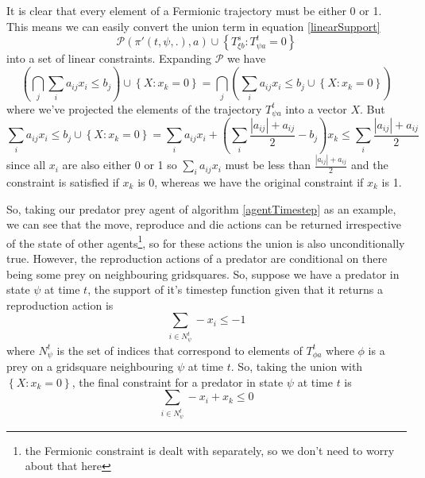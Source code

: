 \documentclass{article}
\begin{document}
It is clear that every element of a Fermionic trajectory must be either 0 or 1. This means we can easily convert the union term in equation \ref{linearSupport} 
\[
\mathcal{P}(\pi'(t,\psi,.), a) \cup \left\{T^s_{\xi b}: T^t_{\psi a} = 0\right\}
\]
into a set of linear constraints. Expanding $\mathcal{P}$ we have
\[
\left(\bigcap_j \sum_i a_{ij}x_i \le b_j \right) \cup \left\{X: x_k = 0\right\} = \bigcap_j \left( \sum_i a_{ij}x_i \le b_j  \cup \left\{X: x_k = 0\right\}\right)
\]
where we've projected the elements of the trajectory $T^t_{\psi a}$ into a vector $X$. But
\[
\sum_i a_{ij}x_i \le b_j  \cup \left\{X: x_k = 0\right\} = \sum_i a_{ij}x_i + \left(\sum_i \frac{|a_{ij}| + a_{ij}}{2} - b_j\right)x_k \le \sum_i \frac{|a_{ij}| + a_{ij}}{2} 
\]
since all $x_i$ are also either 0 or 1 so $\sum_i a_{ij}x_i$ must be less than $\frac{|a_{ij}| + a_{ij}}{2}$ and the constraint is satisfied if $x_k$ is 0, whereas we have the original constraint if $x_k$ is 1.

So, taking our predator prey agent of algorithm \ref{agentTimestep} as an example, we can see that the move, reproduce and die actions can be returned irrespective of the state of other agents\footnote{the Fermionic constraint is dealt with separately, so we don't need to worry about that here}, so for these actions the union is also unconditionally true. However, the reproduction actions of a predator are conditional on there being some prey on neighbouring gridsquares. So, suppose we have a predator in state $\psi$ at time $t$, the support of it's timestep function given that it returns a reproduction action is
\[
\sum_{i \in N^t_\psi} -x_i \le -1
\]
where $N^t_\psi$ is the set of indices that correspond to elements of $T^t_{\phi a}$ where $\phi$ is a prey on a gridsquare neighbouring $\psi$ at time $t$. So, taking the union with $\left\{X: x_k = 0\right\}$, the final constraint for a predator in state $\psi$ at time $t$ is
\[
\sum_{i \in N^t_\psi} -x_i  + x_k  \le 0
\]
\end{document}
